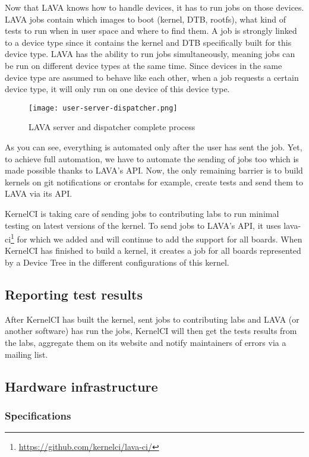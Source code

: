 Now that LAVA knows how to handle devices, it has to run jobs on those devices. LAVA jobs contain which images to boot (kernel, DTB, rootfs), what kind of tests to run when in user space and where to find them. A job is strongly linked to a device type since it contains the kernel and DTB specifically built for this device type. LAVA has the ability to run jobs simultaneously, meaning jobs can be run on different device types at the same time. Since devices in the same device type are assumed to behave like each other, when a job requests a certain device type, it will only run on one device of this device type.

\begin{figure}[H]
  \center
  \texttt{[image: user-server-dispatcher.png]}
  \caption{LAVA server and dispatcher complete process}
\end{figure}

As you can see, everything is automated only after the user has sent the job. Yet, to achieve full automation, we have to automate the sending of jobs too which is made possible thanks to LAVA's API. Now, the only remaining barrier is to build kernels on git notifications or crontabs for example, create tests and send them to LAVA via its API.

KernelCI is taking care of sending jobs to contributing labs to run minimal testing on latest versions of the kernel. To send jobs to LAVA's API, it uses lava-ci\footnote{\url{https://github.com/kernelci/lava-ci/}} for which we added and will continue to add the support for all boards. When KernelCI has finished to build a kernel, it creates a job for all boards represented by a Device Tree in the different configurations of this kernel.

\subsection{Reporting test results}

After KernelCI has built the kernel, sent jobs to contributing labs and LAVA (or another software) has run the jobs, KernelCI will then get the tests results from the labs, aggregate them on its website and notify maintainers of errors via a mailing list.

\subsection{Hardware infrastructure}

\subsubsection{Specifications}

